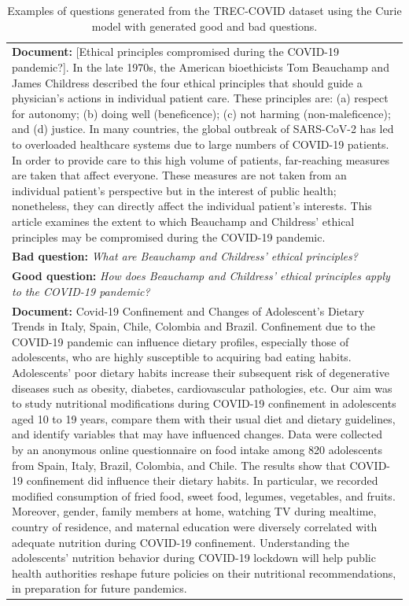 \documentclass[11pt]{article}
\begin{document}
\begin{table}[htbp!]
 \begin{small}
\setlength\tabcolsep{6pt}
 \caption{Examples of questions generated from the TREC-COVID dataset using the Curie model with generated good and bad questions.}
 \label{tab:examples_trec_covid}
\begin{tabularx}{\textwidth}{X}
\toprule
\textbf{\textcolor{blu}{Document:}} {\footnotesize [Ethical principles compromised during the COVID-19 pandemic?]. In the late 1970s, the American bioethicists Tom Beauchamp and James Childress described the four ethical principles that should guide a physician's actions in individual patient care. These principles are: (a) respect for autonomy; (b) doing well (beneficence); (c) not harming (non-maleficence); and (d) justice. In many countries, the global outbreak of SARS-CoV-2 has led to overloaded healthcare systems due to large numbers of COVID-19 patients. In order to provide care to this high volume of patients, far-reaching measures are taken that affect everyone. These measures are not taken from an individual patient's perspective but in the interest of public health; nonetheless, they can directly affect the individual patient's interests. This article examines the extent to which Beauchamp and Childress' ethical principles may be compromised during the COVID-19 pandemic.} \\
\textbf{\textcolor{orng}{Bad question:}} \textit{What are Beauchamp and Childress' ethical principles?}  \\ 
\textbf{\textcolor{rd}{Good question:}}  \textit{How does Beauchamp and Childress' ethical principles apply to the COVID-19 pandemic?}  \\
\midrule
\textbf{\textcolor{blu}{Document:}} {\footnotesize Covid-19 Confinement and Changes of Adolescent's Dietary Trends in Italy, Spain, Chile, Colombia and Brazil. Confinement due to the COVID-19 pandemic can influence dietary profiles, especially those of adolescents, who are highly susceptible to acquiring bad eating habits. Adolescents' poor dietary habits increase their subsequent risk of degenerative diseases such as obesity, diabetes, cardiovascular pathologies, etc. Our aim was to study nutritional modifications during COVID-19 confinement in adolescents aged 10 to 19 years, compare them with their usual diet and dietary guidelines, and identify variables that may have influenced changes. Data were collected by an anonymous online questionnaire on food intake among 820 adolescents from Spain, Italy, Brazil, Colombia, and Chile. The results show that COVID-19 confinement did influence their dietary habits. In particular, we recorded modified consumption of fried food, sweet food, legumes, vegetables, and fruits. Moreover, gender, family members at home, watching TV during mealtime, country of residence, and maternal education were diversely correlated with adequate nutrition during COVID-19 confinement. Understanding the adolescents' nutrition behavior during COVID-19 lockdown will help public health authorities reshape future policies on their nutritional recommendations, in preparation for future pandemics.} \\

\end{tabularx}
\end{small}
\end{table}
\end{document}
